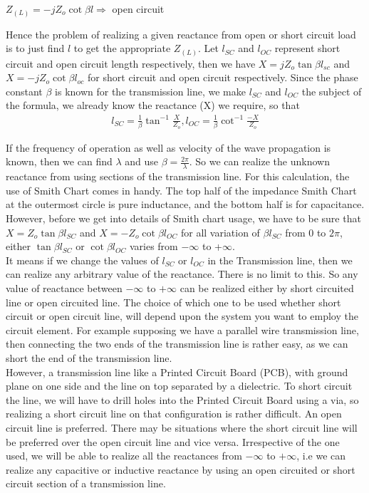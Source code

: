 \begin{center}
$ Z_{(L)} = -jZ_o\cot\beta l \Rightarrow $ open circuit
\end{center}
Hence the problem of realizing a given reactance from open or short circuit load is to just find $ l $ to get the appropriate $Z_{(L)}$. 
Let $l_{SC}$ and $l_{OC}$ represent short circuit and open circuit length respectively, then we have $ X = jZ_o\tan\beta l_{sc} $ and $ X = -jZ_o\cot\beta l_{oc} $ for short circuit and open circuit respectively. Since the phase constant $ \beta $ is known for the transmission line, we make $ l_{SC} $ and $ l_{OC} $ the subject of the formula, we already know the reactance (X) we require, so that 
\begin{align}
l_{SC} = \frac{1}{\beta}\tan^{-1}\frac{X}{Z_o}, l_{OC} = \frac{1}{\beta}\cot^{-1}\frac{-X}{Z_o}
\end{align}

If the frequency of operation as well as velocity of the wave propagation is known, then we can find $\lambda$ and use $ \beta = \frac{2\pi}{\lambda} $. So we can realize the unknown reactance from using sections of the transmission line. For this calculation, the use of Smith Chart comes in handy. The top half of the impedance Smith Chart at the 
outermost circle is pure inductance, and the bottom half is for capacitance.
However, before we get into details of Smith chart usage, we have to be sure that $ X = Z_o\tan\beta l_{SC} $ and $ X = -Z_o\cot\beta l_{OC} $ for all variation of $ \beta l_{SC} $  from 0 to $ 2\pi $, either $ \tan\beta l_{SC} $ or $ \cot\beta l_{OC} $ varies from $ -\infty$ to +$\infty $.\\

It means if we change the values of $ l_{SC} $ or $ l_{OC} $ in the Transmission line, then we can realize any arbitrary value of the reactance. There is no limit to this. So any value of reactance between $ -\infty$ to $+\infty $ can be realized either by short circuited line or open circuited line. The choice of which one to be used whether short circuit or open circuit line, will depend upon the system you want to employ the circuit element.
For example supposing we have a parallel wire transmission line, then connecting the two ends of the transmission line is rather easy, as we can short the end of the transmission line.\\

However, a transmission line like a Printed Circuit Board (PCB), with ground plane on one side and the line on top separated by a dielectric. To short circuit the line, we will have to drill holes into the Printed Circuit Board using a via, so realizing a short circuit line on that configuration is rather difficult. An open circuit line is preferred. There may be situations where the short circuit line will be preferred over the open circuit line and vice versa. Irrespective of the one used, we will be able to realize all the reactances from  $ -\infty$ to $+\infty $, i.e we can realize any capacitive or inductive reactance by using an open circuited or short circuit section of a transmission line.\\

